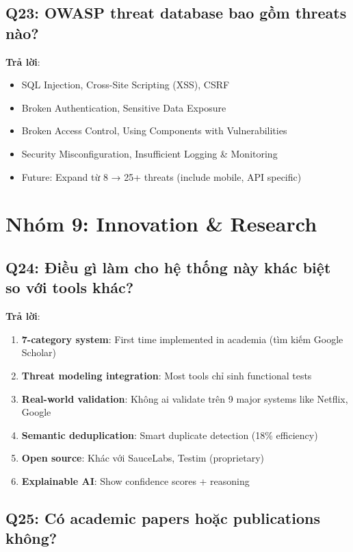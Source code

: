 \documentclass[12pt,a4paper]{report}
\begin{document}
\subsection{Q23: OWASP threat database bao gồm threats nào?}

\textbf{Trả lời}:
\begin{itemize}
    \item SQL Injection, Cross-Site Scripting (XSS), CSRF
    \item Broken Authentication, Sensitive Data Exposure
    \item Broken Access Control, Using Components with Vulnerabilities
    \item Security Misconfiguration, Insufficient Logging & Monitoring
    \item Future: Expand từ 8 → 25+ threats (include mobile, API specific)
\end{itemize}

\section{Nhóm 9: Innovation & Research}

\subsection{Q24: Điều gì làm cho hệ thống này khác biệt so với tools khác?}

\textbf{Trả lời}:
\begin{enumerate}
    \item \textbf{7-category system}: First time implemented in academia (tìm kiếm Google Scholar)
    \item \textbf{Threat modeling integration}: Most tools chỉ sinh functional tests
    \item \textbf{Real-world validation}: Không ai validate trên 9 major systems like Netflix, Google
    \item \textbf{Semantic deduplication}: Smart duplicate detection (18\% efficiency)
    \item \textbf{Open source}: Khác với SauceLabs, Testim (proprietary)
    \item \textbf{Explainable AI}: Show confidence scores + reasoning
\end{enumerate}

\subsection{Q25: Có academic papers hoặc publications không?}
\end{document}
